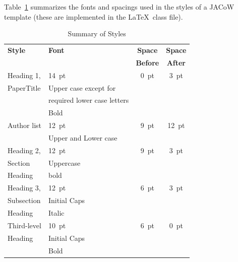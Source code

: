 \documentclass[acus]{jacow}
\begin{document}
Table~\ref{style-tab} summarizes the fonts and spacings used in the styles of
a JACoW template (these are implemented in the \LaTeX\ class file).
\begin{table}[h!t]
    \setlength\tabcolsep{4pt}
    \caption{Summary of Styles}
    \label{style-tab}
    \begin{tabular}{@{}llcc@{}}
        \toprule
        \textbf{Style} & \textbf{Font}               & \textbf{Space}  & \textbf{Space} \\
                       &                             & \textbf{Before} & \textbf{After} \\
        \midrule
         Heading 1,    & \SI{14}{pt}                 & \SI{0}{pt}      & \SI{3}{pt}  \\
          PaperTitle   & Upper case except for       &                 &      \\
                       & required lower case letters &                 &      \\   %
                       & Bold                        &                 &      \\
         \midrule
          Author list  & \SI{12}{pt}                 & \SI{9}{pt}      & \SI{12}{pt} \\
                       & Upper and Lower case        &                 &      \\
         \midrule
         Heading 2,    & \SI{12}{pt}                 & \SI{9}{pt}      & \SI{3}{pt}  \\
         Section       & Uppercase                   &                 &      \\
         Heading       & bold                        &                 &      \\
        \midrule
         Heading 3,    & \SI{12}{pt}                 & \SI{6}{pt}      & \SI{3}{pt}  \\
         Subsection    & Initial Caps                &                 &      \\
         Heading       & Italic                      &                 &      \\
        \midrule
         Third-level   & \SI{10}{pt}                 & \SI{6}{pt}           & \SI{0}{pt}  \\
         Heading       & Initial Caps                &                 &      \\
                       & Bold                        &                 &      \\

\end{tabular}
\end{table}
\end{document}
